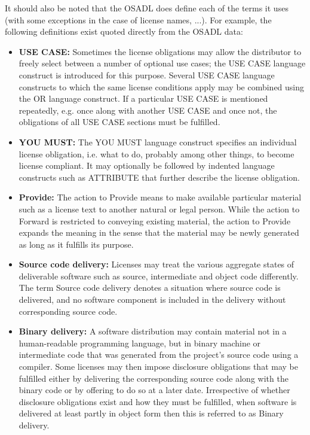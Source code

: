 It should also be noted that the OSADL does define each of the terms it uses (with some exceptions in the case of license names, ...). For example, the following definitions exist quoted directly from the OSADL data:

\begin{itemize}
	\item \textbf{USE CASE:} Sometimes the license obligations may allow the distributor to freely select between a number of optional use cases; the USE CASE language construct is introduced for this purpose. Several USE CASE language constructs to which the same license conditions apply may be combined using the OR language construct. If a particular USE CASE is mentioned repeatedly, e.g. once along with another USE CASE and once not, the obligations of all USE CASE sections must be fulfilled.
	\item \textbf{YOU MUST:} The YOU MUST language construct specifies an individual license obligation, i.e. what to do, probably among other things, to become license compliant. It may optionally be followed by indented language constructs such as ATTRIBUTE that further describe the license obligation.
	\item \textbf{Provide:} The action to Provide means to make available particular material such as a license text to another natural or legal person. While the action to Forward is restricted to conveying existing material, the action to Provide expands the meaning in the sense that the material may be newly generated as long as it fulfills its purpose.
	\item \textbf{Source code delivery:} Licenses may treat the various aggregate states of deliverable software such as source, intermediate and object code differently. The term Source code delivery denotes a situation where source code is delivered, and no software component is included in the delivery without corresponding source code.
	\item \textbf{Binary delivery:} A software distribution may contain material not in a human-readable programming language, but in binary machine or intermediate code that was generated from the project's source code using a compiler. Some licenses may then impose disclosure obligations that may be fulfilled either by delivering the corresponding source code along with the binary code or by offering to do so at a later date. Irrespective of whether disclosure obligations exist and how they must be fulfilled, when software is delivered at least partly in object form then this is referred to as Binary delivery.

\end{itemize}
